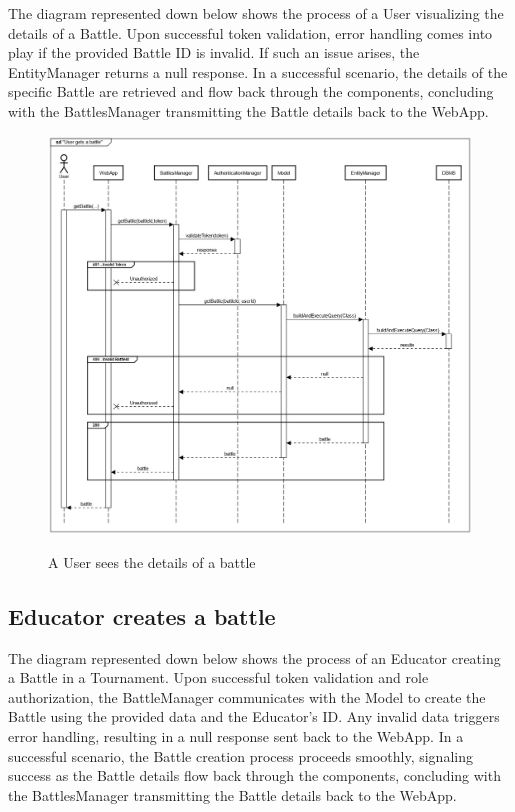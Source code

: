 \documentclass{Configuration_Files/Template}
\begin{document}
The diagram represented down below shows the process of a User visualizing the details of a Battle. Upon successful token validation, error handling comes into play if the provided Battle ID is invalid. If such an issue arises, the EntityManager returns a null response. In a successful scenario, the details of the specific Battle are retrieved and flow back through the components, concluding with the BattlesManager transmitting the Battle details back to the WebApp.

\begin{figure}[H]
\centering
\includegraphics[scale = 0.33]{Images/diagrams/sequences/GetBattle.png}\\
\caption{A User sees the details of a battle}
\end{figure}

\subsection*{Educator creates a battle}

The diagram represented down below shows the process of an Educator creating a Battle in a Tournament. Upon successful token validation and role authorization, the BattleManager communicates with the Model to create the Battle using the provided data and the Educator's ID. Any invalid data triggers error handling, resulting in a null response sent back to the WebApp. In a successful scenario, the Battle creation process proceeds smoothly, signaling success as the Battle details flow back through the components, concluding with the BattlesManager transmitting the Battle details back to the WebApp.
\end{document}
